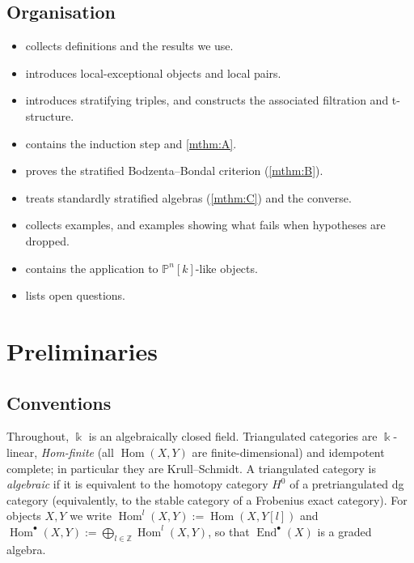 \documentclass[11pt,reqno]{amsart}
\theoremstyle{plain}
\theoremstyle{definition}
\theoremstyle{remark}
\newcommand{\kk}{\Bbbk}
\DeclareMathOperator{\Hom}{Hom}
\DeclareMathOperator{\End}{End}
\newcommand{\Pn}[2]{\mathbb{P}^{#1}[#2]}
\begin{document}
\subsection*{Organisation}
\begin{itemize}
\item {} collects definitions and the results we use.
\item {} introduces local-exceptional objects and local pairs.
\item {} introduces stratifying triples, and constructs the associated filtration and t-structure.
\item {} contains the induction step and \cref{mthm:A}.
\item {} proves the stratified Bodzenta--Bondal criterion (\cref{mthm:B}).
\item {} treats standardly stratified algebras (\cref{mthm:C}) and the converse.
\item {} collects examples, and examples showing what fails when hypotheses are dropped.
\item {} contains the application to $\Pn nk$-like objects.
\item {} lists open questions.
\end{itemize}

\section{Preliminaries}\label{sec:prelim}

\subsection{Conventions}\label{sec:conventions}
Throughout, $\kk$ is an algebraically closed field. Triangulated categories are $\kk$-linear, \emph{Hom-finite} (all $\Hom(X,Y)$ are finite-dimensional) and idempotent complete; in particular they are Krull--Schmidt. A triangulated category is \emph{algebraic} if it is equivalent to the homotopy category $H^0$ of a pretriangulated dg category (equivalently, to the stable category of a Frobenius exact category). For objects $X,Y$ we write $\Hom^l(X,Y):=\Hom(X,Y[l])$ and $\Hom^\bullet(X,Y):=\bigoplus_{l\in\mathbb{Z}}\Hom^l(X,Y)$, so that $\End^\bullet(X)$ is a graded algebra.
\end{document}
